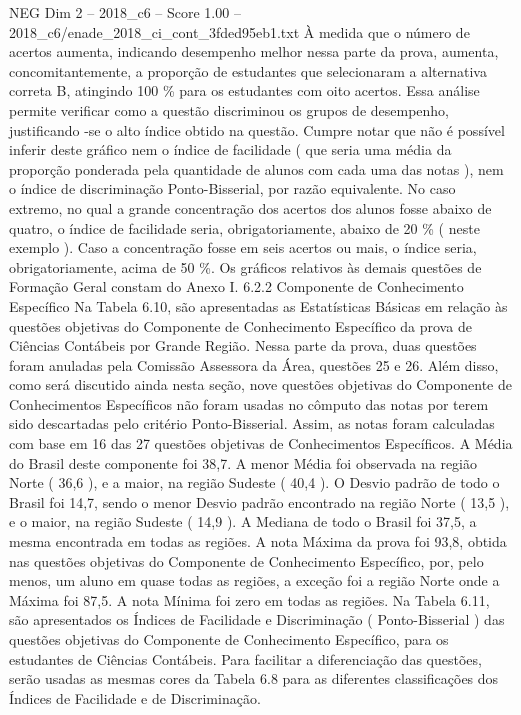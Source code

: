 \begin{textsample}{NEG Dim 2 – 2018\_c6 – Score 1.00 – 2018\_c6/enade\_2018\_ci\_cont\_3fded95eb1.txt}
À medida que o número de acertos aumenta, indicando desempenho melhor nessa parte da prova, aumenta, concomitantemente, a proporção de estudantes que selecionaram a alternativa correta B, atingindo 100 \% para os estudantes com oito acertos.
Essa análise permite verificar como a questão discriminou os grupos de desempenho, justificando -se o alto índice obtido na questão.
Cumpre notar que não é possível inferir deste gráfico nem o índice de facilidade ( que seria uma média da proporção ponderada pela quantidade de alunos com cada uma das notas ), nem o índice de discriminação Ponto-Bisserial, por razão equivalente.
No caso extremo, no qual a grande concentração dos acertos dos alunos fosse abaixo de quatro, o índice de facilidade seria, obrigatoriamente, abaixo de 20 \% ( neste exemplo ).
Caso a concentração fosse em seis acertos ou mais, o índice seria, obrigatoriamente, acima de 50 \%.
Os gráficos relativos às demais questões de Formação Geral constam do Anexo I. 6.2.2 Componente de Conhecimento Específico Na Tabela 6.10, são apresentadas as Estatísticas Básicas em relação às questões objetivas do Componente de Conhecimento Específico da prova de Ciências Contábeis por Grande Região.
Nessa parte da prova, duas questões foram anuladas pela Comissão Assessora da Área, questões 25 e 26.
Além disso, como será discutido ainda nesta seção, nove questões objetivas do Componente de Conhecimentos Específicos não foram usadas no cômputo das notas por terem sido descartadas pelo critério Ponto-Bisserial.
Assim, as notas foram calculadas com base em 16 das 27 questões objetivas de Conhecimentos Específicos.
A Média do Brasil deste componente foi 38,7.
A menor Média foi observada na região Norte ( 36,6 ), e a maior, na região Sudeste ( 40,4 ).
O Desvio padrão de todo o Brasil foi 14,7, sendo o menor Desvio padrão encontrado na região Norte ( 13,5 ), e o maior, na região Sudeste ( 14,9 ).
A Mediana de todo o Brasil foi 37,5, a mesma encontrada em todas as regiões.
A nota Máxima da prova foi 93,8, obtida nas questões objetivas do Componente de Conhecimento Específico, por, pelo menos, um aluno em quase todas as regiões, a exceção foi a região Norte onde a Máxima foi 87,5.
A nota Mínima foi zero em todas as regiões.
Na Tabela 6.11, são apresentados os Índices de Facilidade e Discriminação ( Ponto-Bisserial ) das questões objetivas do Componente de Conhecimento Específico, para os estudantes de Ciências Contábeis.
Para facilitar a diferenciação das questões, serão usadas as mesmas cores da Tabela 6.8 para as diferentes classificações dos Índices de Facilidade e de Discriminação.

\end{textsample}
